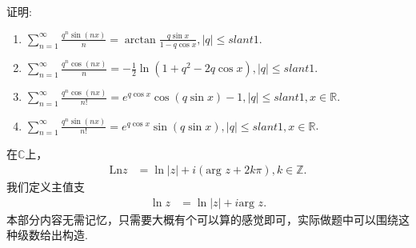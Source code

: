 \documentclass[../../main.tex]{subfiles}
\begin{document}
\begin{proposition}\label{proposition:常用级数公式1}
证明:
\begin{enumerate}[(1)]
\item \(\sum_{n = 1}^{\infty} \frac{q^{n} \sin(nx)}{n}= \arctan \frac{q \sin x}{1 - q \cos x}, |q| \leqslant slant 1\).

\item \(\sum_{n = 1}^{\infty} \frac{q^{n} \cos(nx)}{n}= -\frac{1}{2} \ln(1 + q^{2} - 2q \cos x), |q| \leqslant slant 1\).

\item \(\sum_{n = 1}^{\infty} \frac{q^{n} \cos(nx)}{n!}= e^{q \cos x} \cos(q \sin x) - 1, |q| \leqslant slant 1, x \in \mathbb{R}\).

\item \(\sum_{n = 1}^{\infty} \frac{q^{n} \sin(nx)}{n!}= e^{q \cos x} \sin(q \sin x), |q| \leqslant slant 1, x \in \mathbb{R}\).
\end{enumerate}
\end{proposition}
\begin{note}
在\(\mathbb{C}\)上，
\begin{align*}
\text{Ln}z &= \ln|z| + i(\text{arg }z + 2k\pi), k \in \mathbb{Z}.  
\end{align*}
我们定义主值支
\begin{align*}
\ln z &= \ln|z| + i\text{arg }z. 
\end{align*}
本部分内容无需记忆，只需要大概有个可以算的感觉即可，实际做题中可以围绕这种级数给出构造.
\end{note}
\end{document}
